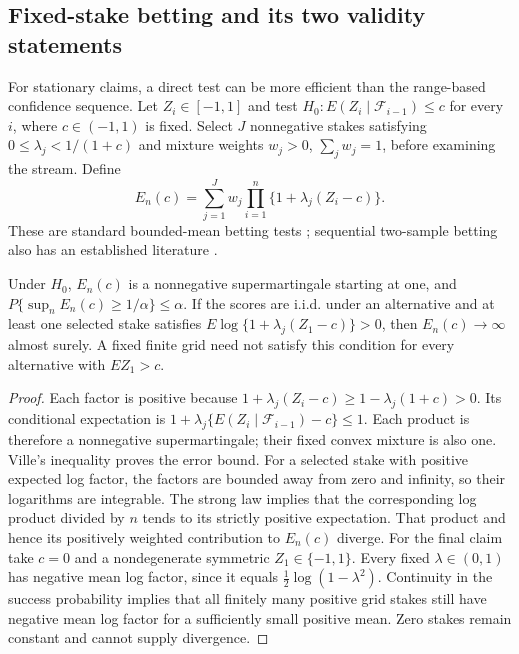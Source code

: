 \subsection{Fixed-stake betting and its two validity statements}

For stationary claims, a direct test can be more efficient than the
range-based confidence sequence. Let $Z_i\in[-1,1]$ and test
$H_0:E(Z_i\mid\mathcal F_{i-1})\leq c$ for every $i$, where
$c\in(-1,1)$ is fixed. Select $J$ nonnegative stakes satisfying
$0\leq\lambda_j<1/(1+c)$ and mixture weights
$w_j>0$, $\sum_jw_j=1$, before examining the stream. Define
\begin{equation}
 E_n(c)=\sum_{j=1}^J w_j
             \prod_{i=1}^n\{1+\lambda_j(Z_i-c)\}.
 \label{eq:betting_e}
\end{equation}
These are standard bounded-mean betting tests
\citep{waudbysmith2024betting}; sequential two-sample betting also has an
established literature \citep{shekhar2024betting,podkopaev2023predictive}.

\begin{theorem}
\label{thm:betting}
Under $H_0$, $E_n(c)$ is a nonnegative supermartingale starting at one,
and
$P\{\sup_n E_n(c)\geq1/\alpha\}\leq\alpha$.
If the scores are i.i.d. under an alternative and at least one selected
stake satisfies
$E\log\{1+\lambda_j(Z_1-c)\}>0$, then $E_n(c)\to\infty$ almost surely.
A fixed finite grid need not satisfy this condition for every alternative
with $E Z_1>c$.
\end{theorem}
\begin{proof}
Each factor is positive because
$1+\lambda_j(Z_i-c)\geq1-\lambda_j(1+c)>0$.
Its conditional expectation is
$1+\lambda_j\{E(Z_i\mid\mathcal F_{i-1})-c\}\leq1$.
Each product is therefore a nonnegative supermartingale; their fixed
convex mixture is also one. Ville's inequality proves the error bound.
For a selected stake with positive expected log factor, the factors are
bounded away from zero and infinity, so their logarithms are integrable.
The strong law implies that the corresponding log product divided by
$n$ tends to its strictly positive expectation. That product and hence
its positively weighted contribution to $E_n(c)$ diverge.
For the final claim take $c=0$ and a nondegenerate symmetric
$Z_1\in\{-1,1\}$. Every fixed $\lambda\in(0,1)$ has negative mean
log factor, since it equals $\tfrac12\log(1-\lambda^2)$.
Continuity in the success probability implies that all finitely many
positive grid stakes still have negative mean log factor for a sufficiently
small positive mean. Zero stakes remain constant and cannot supply
divergence.
\end{proof}

